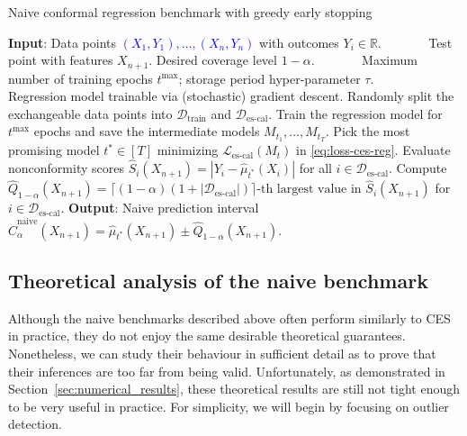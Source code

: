 \begin{algorithm}[H]
    \caption{Naive conformal regression benchmark with greedy early stopping}
    \label{alg:naive-reg}
    \begin{algorithmic}[1]
        \STATE \textbf{Input}: Data points \textcolor{blue}{$(X_{1},Y_{1}), \ldots, (X_{n},Y_{n})$} with outcomes $Y_i \in \mathbb{R}$.
        \STATE \textcolor{white}{\textbf{Input}:} Test point with features $X_{n+1}$. Desired coverage level $1-\alpha$.
        \STATE \textcolor{white}{\textbf{Input}:} Maximum number of training epochs $t^{\max}$; storage period hyper-parameter $\tau$.
        \STATE \textcolor{white}{\textbf{Input}:} Regression model trainable via (stochastic) gradient descent.
        \STATE Randomly split the exchangeable data points into $\mathcal{D}_{\text{train}}$ and $\mathcal{D}_{\text{es-cal}}$.
        \STATE Train the regression model for $t^{\text{max}}$ epochs and save the intermediate models $M_{t_1} , \dots, M_{t_T}$.
        \STATE Pick the most promising model $t^* \in [T]$ minimizing $\mathcal{L}_{\text{es-cal}}(M_t)$ in \eqref{eq:loss-ces-reg}.
        \STATE Evaluate nonconformity scores $\hat{S}_i(X_{n+1}) = | Y_i - \hat{\mu}_{t^*}(X_{i})|$ for all $i \in \mathcal{D}_{\text{es-cal}}$.
        \STATE Compute $\hat{Q}_{1-\alpha}(X_{n+1}) = \lceil (1-\alpha)(1+|\mathcal{D}_{\text{es-cal}}|) \rceil\text{-th largest value in }
        \hat{S}_i(X_{n+1})$ for $i \in \mathcal{D}_{\text{es-cal}}$.
        \STATE \textbf{Output}: Naive prediction interval $\hat{C}^{\text{naive}}_{\alpha}(X_{n+1}) = \hat{\mu}_{t^*}(X_{n+1}) \pm \hat{Q}_{1-\alpha}(X_{n+1})$.
    \end{algorithmic}
\end{algorithm}


\subsection{Theoretical analysis of the naive benchmark} \label{app:naive-analysis}

Although the naive benchmarks described above often perform similarly to CES in practice, they do not enjoy the same desirable theoretical guarantees.
Nonetheless, we can study their behaviour in sufficient detail as to prove that their inferences are too far from being valid.
Unfortunately, as demonstrated in Section~\ref{sec:numerical_results}, these theoretical results are still not tight enough to be very useful in practice.
For simplicity, we will begin by focusing on outlier detection.


